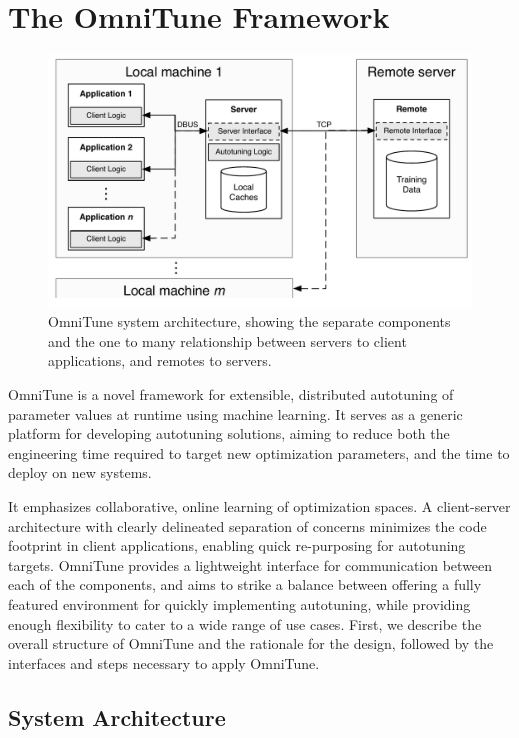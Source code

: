 \documentclass[nonatbib,preprint,nocopyrightspace,9pt]{sigplanconf}
\begin{document}
\section{The OmniTune Framework}\label{sec:autotune}

\begin{figure}
\centering
\includegraphics[width=.98\columnwidth]{img/omnitune-system-overview.pdf}
\caption{%
  OmniTune system architecture, showing the separate components and
  the one to many relationship between servers to client applications,
  and remotes to servers.
  \vspace{-1em}%
}
\label{fig:omnitune-system-overview}
\end{figure}

OmniTune is a novel framework for extensible, distributed autotuning
of parameter values at runtime using machine learning. It serves as a
generic platform for developing autotuning solutions, aiming to reduce
both the engineering time required to target new optimization
parameters, and the time to deploy on new systems.

It emphasizes collaborative, online learning of optimization spaces. A
client-server architecture with clearly delineated separation of
concerns minimizes the code footprint in client applications, enabling
quick re-purposing for autotuning targets. OmniTune provides a
lightweight interface for communication between each of the
components, and aims to strike a balance between offering a fully
featured environment for quickly implementing autotuning, while
providing enough flexibility to cater to a wide range of use
cases. First, we describe the overall structure of OmniTune and the
rationale for the design, followed by the interfaces and steps
necessary to apply OmniTune.


\subsection{System Architecture}
\end{document}
